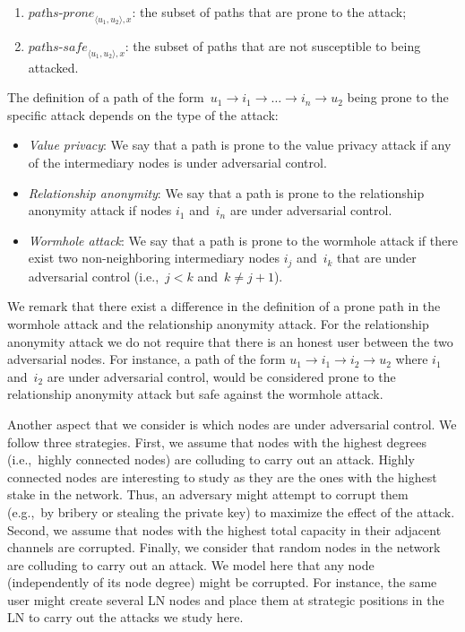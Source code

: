 \begin{enumerate}
	\item $\textit{paths-prone}_{\langle u_1, u_2 \rangle, x}$: the subset of paths that are prone to the attack;
	\item $\textit{paths-safe}_{\langle u_1, u_2 \rangle, x}$: the subset of paths that are not susceptible to being attacked.
\end{enumerate}

The definition of a path of the form~$u_1 \rightarrow i_1 \rightarrow \ldots \rightarrow i_n \rightarrow u_2$ being prone to the specific attack depends on the type of the attack:

\begin{itemize}
	\item \textit{Value privacy}: We say that a path is prone to the value privacy attack if any of the intermediary nodes is under adversarial control.
	
	\item \textit{Relationship anonymity}: We say that a path is prone to the relationship anonymity attack if nodes $i_1$ and~$i_n$ are under adversarial control.
	
	\item \textit{Wormhole attack}: We say that a path is prone to the wormhole attack if there exist two non-neighboring intermediary 
	nodes $i_j$ and~$i_k$ that are under adversarial control (i.e.,~$j < k$ and~$k \neq j + 1$).
\end{itemize}

We remark that there exist a difference in the definition of a prone path in the wormhole attack and the relationship anonymity attack.
For the relationship anonymity attack we do not require that there is an honest user between the two adversarial nodes.
For instance, a path of the form $u_1 \rightarrow i_1 \rightarrow i_2 \rightarrow u_2$ where $i_1$ and~$i_2$ are under adversarial control, would be considered prone to the relationship anonymity attack but safe against the wormhole attack.

Another aspect that we consider is which nodes are under adversarial control.
We follow three strategies.
First, we assume that nodes with the highest degrees (i.e.,~highly connected nodes) are colluding to carry out an attack.
Highly connected nodes are interesting to study as they are the ones with the highest stake in the network.
Thus, an adversary might attempt to corrupt them (e.g.,~by bribery or stealing the private key) to maximize the effect of the attack.
Second, we assume that nodes with the highest total capacity in their adjacent channels are corrupted.
Finally, we consider that random nodes in the network are colluding to carry out an attack.
We model here that any node (independently of its node degree) might be corrupted.
For instance, the same user might create several LN nodes and place them at strategic positions in the LN to carry out the attacks we study here.

